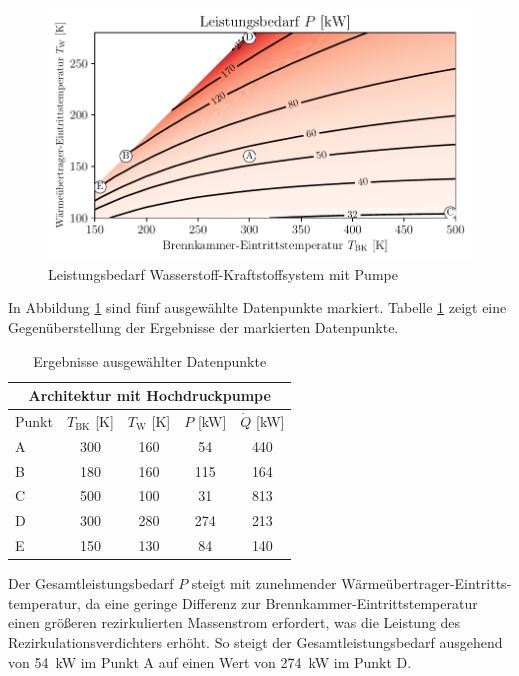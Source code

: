 \begin{figure}[ht]
\centering
\includegraphics[width=0.95\linewidth]{4_Abbildungen/2_Hauptteil/Ergebnisse/Pumpepowercontour.pdf}
  \caption{Leistungsbedarf Wasserstoff-Kraftstoffsystem mit Pumpe}
  \label{fig:pumppower}
\end{figure}
\FloatBarrier

In Abbildung \ref{fig:pumppower} sind fünf ausgewählte Datenpunkte markiert. Tabelle \ref{Tab:punkte} zeigt eine Gegenüberstellung der Ergebnisse der markierten Datenpunkte.

\begin{table}[ht]
	\centering
	\caption{Ergebnisse ausgewählter Datenpunkte}
	\begin{tabular} {|l|c|c|c|c|} \hline%
		\multicolumn{5}{|c|}{Architektur mit Hochdruckpumpe}\\ \hline
		Punkt & $T_\mathrm{BK}$ [K] & $T_\mathrm{W}$ [K] & $P$ [kW] & $\dot{Q}$ [kW] \\ \hline\hline%
		A & 300 & 160 & 54 & 440 \\ \hline
		B & 180 & 160 & 115 & 164 \\ \hline
		C & 500 & 100 & 31 & 813 \\ \hline
		D & 300 & 280 & 274 & 213 \\ \hline
		E & 150 & 130 & 84 & 140 \\ \hline
	\end{tabular}	
	\label{Tab:punkte}%
\end{table}
\FloatBarrier 

Der Gesamtleistungsbedarf $P$ steigt mit zunehmender Wärmeübertrager-Eintritts-temperatur, da eine geringe Differenz zur Brennkammer-Eintrittstemperatur einen größeren rezirkulierten Massenstrom erfordert, was die Leistung des Rezirkulationsverdichters erhöht. So steigt der Gesamtleistungsbedarf ausgehend von \SI{54}{\kilo\W} im Punkt A auf einen Wert von \SI{274}{\kilo\W} im Punkt D. 

